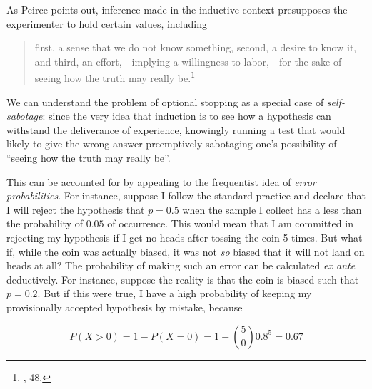 
As Peirce points out, inference made in the inductive context presupposes the experimenter to hold certain values, including

\begin{quote}
first, a sense that we do not know something, second, a desire to know
it, and third, an effort,---implying a willingness to labor,---for the
sake of seeing how the truth may really be.\footnote{\cite{essentialpeirce2}, 48.}
\end{quote}
We can understand the problem of optional stopping as a special
case of \emph{self-sabotage}: since the very idea that induction is to see how a hypothesis can withstand the deliverance of experience, knowingly running a test that would likely to give the wrong answer preemptively sabotaging one's possibility of ``seeing how the truth may really be''.  

%

This can be accounted for by appealing to the frequentist idea of \emph{error probabilities}. For instance,
suppose I follow the standard practice and declare that I will reject
the hypothesis that \(p=0.5\) when the sample I collect has a less than
the probability of \(0.05\) of occurrence. This would mean that I am
committed in rejecting my hypothesis if I get no heads after tossing
the coin 5 times. But what if, while the coin was actually biased, 
 it was not \emph{so} biased that it will not land on heads at all? The probability of
making such an error can be calculated \emph{ex ante} deductively. For
instance, suppose the reality is that the coin is biased such that
\(p=0.2\). But if this were true, I have a high probability of keeping
my provisionally accepted hypothesis by mistake, because

\[P(X > 0) = 1 - P(X=0) = 1 - {5 \choose 0} 0.8^5 = 0.67\]

